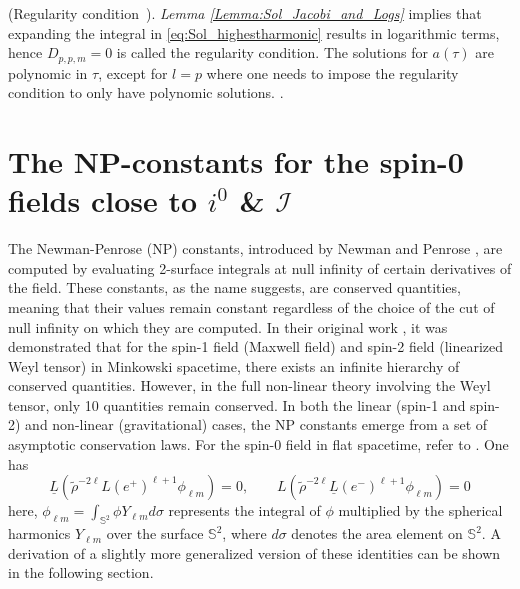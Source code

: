 \begin{remark}\label{Remark:logfreeRemark}(Regularity condition~\cite{MinMacKro22}).
  \emph{Lemma \ref{Lemma:Sol_Jacobi_and_Logs}} implies that expanding the integral in \eqref{eq:Sol_highestharmonic} results in logarithmic terms, hence
  $D_{p,p,m} = 0$ is called the regularity condition. The solutions for
  $a(\tau)$ are polynomic in $\tau$, except for $l = p$ where one needs
  to impose the regularity condition to only have polynomic
  solutions. \cite{MinMacKro22}.
\end{remark}
\chapter{The NP-constants for the spin-0 fields close to $i^0$ \& $\mathscr{I}$}
\label{chapter:NPConstants}


The Newman-Penrose (NP) constants, introduced by Newman and Penrose \cite{NewPen68}, are computed by evaluating 2-surface integrals at null infinity of certain derivatives of the field. These constants, as the name suggests, are conserved quantities, meaning that their values remain constant regardless of the choice of the cut of null infinity on which they are computed. In their original work \cite{NewPen68}, it was demonstrated that for the spin-1 field (Maxwell field) and spin-2 field (linearized Weyl tensor) in Minkowski spacetime, there exists an infinite hierarchy of conserved quantities. However, in the full non-linear theory involving the Weyl tensor, only 10 quantities remain conserved. In both the linear (spin-1 and spin-2) and non-linear (gravitational) cases, the NP constants emerge from a set of asymptotic conservation laws. For the spin-0 field in flat spacetime, refer to \cite{Keh21_a}. One has
\begin{equation}\label{eq:cons_laws}
  {\underline{{L}}}({\tilde{\rho}}^{-2\ell}L(e^{+})^{\ell+1}\phi_{\ell m})=0, \qquad L({\tilde{\rho}}^{-2\ell}\underline{L}(e^{-})^{\ell+1}\phi_{\ell m})=0
\end{equation}
here, $\phi_{\ell m}= \int_{\mathbb{S}^2} \phi  Y_{\ell m}  d\sigma$ represents the integral of $\phi$ multiplied by the spherical harmonics $Y_{\ell m}$ over the surface $\mathbb{S}^2$, where $d\sigma$ denotes the area element on $\mathbb{S}^2$. A derivation of a slightly more generalized version of these identities can be shown in the following section.

